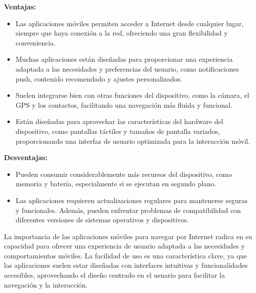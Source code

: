 \documentclass[12pt]{article}
\begin{document}
                        \textbf{Ventajas:}

                        \begin{itemize}
                                \item Las aplicaciones móviles permiten acceder a Internet desde cualquier lugar, siempre que haya conexión a la red, ofreciendo una gran flexibilidad y conveniencia.
                                \item Muchas aplicaciones están diseñadas para proporcionar una experiencia adaptada a las necesidades y preferencias del usuario, como notificaciones push, contenido recomendado y ajustes personalizados.
                                \item Suelen integrarse bien con otras funciones del dispositivo, como la cámara, el GPS y los contactos, facilitando una navegación más fluida y funcional.
                                \item Están diseñadas para aprovechar las características del hardware del dispositivo, como pantallas táctiles y tamaños de pantalla variados, proporcionando una interfaz de usuario optimizada para la interacción móvil.
                        \end{itemize}

                        \textbf{Desventajas:}

                        \begin{itemize}
                                \item Pueden consumir considerablemente más recursos del dispositivo, como memoria y batería, especialmente si se ejecutan en segundo plano.
                                \item Las aplicaciones requieren actualizaciones regulares para mantenerse seguras y funcionales. Además, pueden enfrentar problemas de compatibilidad con diferentes versiones de sistemas operativos y dispositivos.
                        \end{itemize}

                        La importancia de las aplicaciones móviles para navegar por Internet radica en su capacidad para ofrecer una experiencia de usuario adaptada a las necesidades y comportamientos móviles. La facilidad de uso es una característica clave, ya que las aplicaciones suelen estar diseñadas con interfaces intuitivas y funcionalidades accesibles, aprovechando el diseño centrado en el usuario para facilitar la navegación y la interacción.
\end{document}
